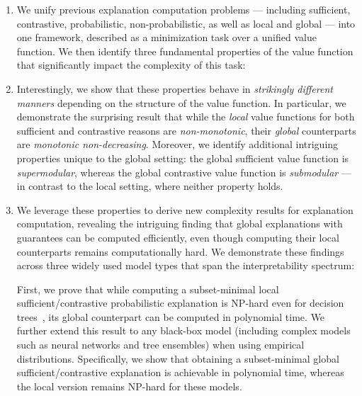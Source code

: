 \documentclass{article}
\begin{document}
\begin{enumerate}
    \item We unify previous explanation computation problems --- including sufficient, contrastive, probabilistic, non-probabilistic, as well as local and global --- into one framework, described as a minimization task over a unified value function. We then identify three fundamental properties of the value function that significantly impact the complexity of this task: 
    \item Interestingly, we show that these properties behave in \emph{strikingly different manners} depending on the structure of the value function. In particular, we demonstrate the surprising result that while the \emph{local} value functions for both sufficient and contrastive reasons are \emph{non-monotonic}, their \emph{global} counterparts are \emph{monotonic non-decreasing}. Moreover, we identify additional intriguing properties unique to the global setting: the global sufficient value function is \emph{supermodular}, whereas the global contrastive value function is \emph{submodular} --- in contrast to the local setting, where neither property holds.
    \item We leverage these properties to derive new complexity results for explanation computation, revealing the intriguing finding that global explanations with guarantees can be computed efficiently, even though computing their local counterparts remains computationally hard. We demonstrate these findings across three widely used model types that span the interpretability spectrum:  First, we prove that while computing a subset-minimal local sufficient/contrastive probabilistic explanation is NP-hard even for decision trees~\citep{arenas2022computing}, its global counterpart can be computed in polynomial time. We further extend this result to any black-box model (including complex models such as neural networks and tree ensembles) when using empirical distributions. Specifically, we show that obtaining a subset-minimal global sufficient/contrastive explanation is achievable in polynomial time, whereas the local version remains NP-hard for these models.

\end{enumerate}
\end{document}
